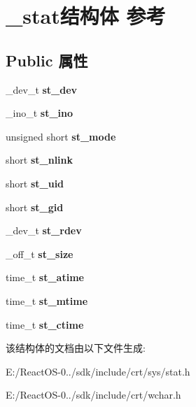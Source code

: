 \hypertarget{struct__stat}{}\section{\+\_\+stat结构体 参考}
\label{struct__stat}
\subsection*{Public 属性}
\begin{DoxyCompactItemize}
\item 
\mbox{\label{struct__stat_aa601d2dbad1278bdfe6ac3d15a943aa3}} 
\+\_\+dev\+\_\+t {\bfseries st\+\_\+dev}
\item 
\mbox{\label{struct__stat_ac0b55d1538c38aac4fa711de4d508145}} 
\+\_\+ino\+\_\+t {\bfseries st\+\_\+ino}
\item 
\mbox{\label{struct__stat_ac9ca4bca7d2bf05e05dd12405c648f39}} 
unsigned short {\bfseries st\+\_\+mode}
\item 
\mbox{\label{struct__stat_a840980cd17e3e1dd42b34a53e196f5ad}} 
short {\bfseries st\+\_\+nlink}
\item 
\mbox{\label{struct__stat_a8458c64ad44b45472aa4d60f61fe2882}} 
short {\bfseries st\+\_\+uid}
\item 
\mbox{\label{struct__stat_aea4ff6c887252e806752f8f580712d4d}} 
short {\bfseries st\+\_\+gid}
\item 
\mbox{\label{struct__stat_af8547462c844db5f36420c2fe02d38b5}} 
\+\_\+dev\+\_\+t {\bfseries st\+\_\+rdev}
\item 
\mbox{\label{struct__stat_a6e769549fe149394fa42da022e3d94e4}} 
\+\_\+off\+\_\+t {\bfseries st\+\_\+size}
\item 
\mbox{\label{struct__stat_ad1d7bae18f661ea098d8ffb9dde704e3}} 
time\+\_\+t {\bfseries st\+\_\+atime}
\item 
\mbox{\label{struct__stat_a30339b64df12dabd007a9545d0f5b760}} 
time\+\_\+t {\bfseries st\+\_\+mtime}
\item 
\mbox{\label{struct__stat_a1644456c6826e41e32a2ad05f6d3b4a5}} 
time\+\_\+t {\bfseries st\+\_\+ctime}
\end{DoxyCompactItemize}


该结构体的文档由以下文件生成\+:\begin{DoxyCompactItemize}
\item 
E\+:/\+React\+O\+S-\/0../sdk/include/crt/sys/stat.\+h\item 
E\+:/\+React\+O\+S-\/0../sdk/include/crt/wchar.\+h\end{DoxyCompactItemize}
